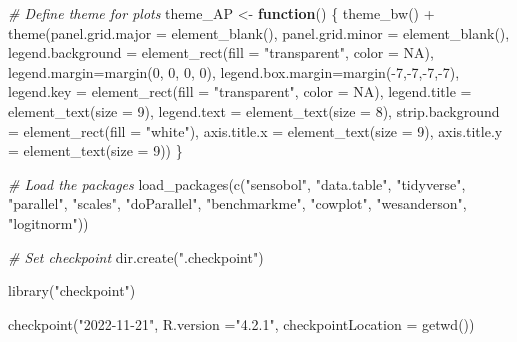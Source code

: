 \documentclass[
  11pt,
]{article}
\newenvironment{Shaded}{\begin{snugshade}}{\end{snugshade}}
\newcommand{\AttributeTok}[1]{\textcolor[rgb]{0.77,0.63,0.00}{#1}}
\newcommand{\CommentTok}[1]{\textcolor[rgb]{0.56,0.35,0.01}{\textit{#1}}}
\newcommand{\ConstantTok}[1]{\textcolor[rgb]{0.00,0.00,0.00}{#1}}
\newcommand{\ControlFlowTok}[1]{\textcolor[rgb]{0.13,0.29,0.53}{\textbf{#1}}}
\newcommand{\DecValTok}[1]{\textcolor[rgb]{0.00,0.00,0.81}{#1}}
\newcommand{\FunctionTok}[1]{\textcolor[rgb]{0.00,0.00,0.00}{#1}}
\newcommand{\NormalTok}[1]{#1}
\newcommand{\OtherTok}[1]{\textcolor[rgb]{0.56,0.35,0.01}{#1}}
\newcommand{\SpecialCharTok}[1]{\textcolor[rgb]{0.00,0.00,0.00}{#1}}
\newcommand{\StringTok}[1]{\textcolor[rgb]{0.31,0.60,0.02}{#1}}
\begin{document}
\begin{Shaded}
\begin{Highlighting}[]
\CommentTok{\# Define theme for plots}
\NormalTok{theme\_AP }\OtherTok{\textless{}{-}} \ControlFlowTok{function}\NormalTok{() \{}
  \FunctionTok{theme\_bw}\NormalTok{() }\SpecialCharTok{+}
    \FunctionTok{theme}\NormalTok{(}\AttributeTok{panel.grid.major =} \FunctionTok{element\_blank}\NormalTok{(),}
          \AttributeTok{panel.grid.minor =} \FunctionTok{element\_blank}\NormalTok{(),}
          \AttributeTok{legend.background =} \FunctionTok{element\_rect}\NormalTok{(}\AttributeTok{fill =} \StringTok{"transparent"}\NormalTok{,}
                                           \AttributeTok{color =} \ConstantTok{NA}\NormalTok{),}
          \AttributeTok{legend.margin=}\FunctionTok{margin}\NormalTok{(}\DecValTok{0}\NormalTok{, }\DecValTok{0}\NormalTok{, }\DecValTok{0}\NormalTok{, }\DecValTok{0}\NormalTok{),}
          \AttributeTok{legend.box.margin=}\FunctionTok{margin}\NormalTok{(}\SpecialCharTok{{-}}\DecValTok{7}\NormalTok{,}\SpecialCharTok{{-}}\DecValTok{7}\NormalTok{,}\SpecialCharTok{{-}}\DecValTok{7}\NormalTok{,}\SpecialCharTok{{-}}\DecValTok{7}\NormalTok{),}
          \AttributeTok{legend.key =} \FunctionTok{element\_rect}\NormalTok{(}\AttributeTok{fill =} \StringTok{"transparent"}\NormalTok{,}
                                    \AttributeTok{color =} \ConstantTok{NA}\NormalTok{),}
          \AttributeTok{legend.title =} \FunctionTok{element\_text}\NormalTok{(}\AttributeTok{size =} \DecValTok{9}\NormalTok{),}
          \AttributeTok{legend.text =} \FunctionTok{element\_text}\NormalTok{(}\AttributeTok{size =} \DecValTok{8}\NormalTok{),}
          \AttributeTok{strip.background =} \FunctionTok{element\_rect}\NormalTok{(}\AttributeTok{fill =} \StringTok{"white"}\NormalTok{),}
          \AttributeTok{axis.title.x =} \FunctionTok{element\_text}\NormalTok{(}\AttributeTok{size =} \DecValTok{9}\NormalTok{),}
          \AttributeTok{axis.title.y =} \FunctionTok{element\_text}\NormalTok{(}\AttributeTok{size =} \DecValTok{9}\NormalTok{))}
\NormalTok{\}}

\CommentTok{\# Load the packages}
\FunctionTok{load\_packages}\NormalTok{(}\FunctionTok{c}\NormalTok{(}\StringTok{"sensobol"}\NormalTok{, }\StringTok{"data.table"}\NormalTok{, }\StringTok{"tidyverse"}\NormalTok{, }\StringTok{"parallel"}\NormalTok{,}
               \StringTok{"scales"}\NormalTok{, }\StringTok{"doParallel"}\NormalTok{, }\StringTok{"benchmarkme"}\NormalTok{,}
               \StringTok{"cowplot"}\NormalTok{, }\StringTok{"wesanderson"}\NormalTok{, }\StringTok{"logitnorm"}\NormalTok{))}


\CommentTok{\# Set checkpoint}
\FunctionTok{dir.create}\NormalTok{(}\StringTok{".checkpoint"}\NormalTok{)}

\FunctionTok{library}\NormalTok{(}\StringTok{"checkpoint"}\NormalTok{)}

\FunctionTok{checkpoint}\NormalTok{(}\StringTok{"2022{-}11{-}21"}\NormalTok{, }
           \AttributeTok{R.version =}\StringTok{"4.2.1"}\NormalTok{, }
           \AttributeTok{checkpointLocation =} \FunctionTok{getwd}\NormalTok{())}
\end{Highlighting}
\end{Shaded}
\end{document}
